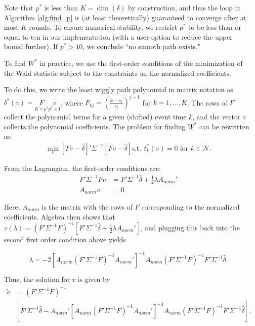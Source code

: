 \documentclass[12pt]{article}
\begin{document}
Note that $p^*$ is less than $K=\dim(\delta)$ by construction, and thus the loop in Algorithm \ref{alg:find_p} is (at least theoretically) guaranteed to converge after at most $K$ rounds.
To ensure numerical stability, we restrict $p^*$ to be less than or equal to ten in our implementation (with a user option to reduce the upper bound further).
If $p^{*}>10$, we conclude ``no smooth path exists."

To find $W^*$ in practice, we use the first-order conditions of the minimization of the Wald statistic subject to the constraints on the normalized coefficients.

To do this, we write the least wiggly path polynomial in matrix notation as $\delta^*(v) = \underset{K\times p^*}{F} \underset{p^* \times 1}{v} $, where $F_{kj} = \left(\frac{k-s_1}{s_2}\right)^{j-1}$ for $k=1, \ldots, K$.
The rows of $F$ collect the polynomial terms for a given (shifted) event time $k$, and the vector $v$ collects the polynomial coefficients.
The problem for finding $W^*$ can be rewritten as:
\begin{align}
\min_v \left[Fv-\widehat{\delta}\right]'\Sigma^{-1}\left[Fv-\widehat{\delta}\right] \text{s.t. } \delta_{k}^*(v)=0 \text{ for } k \in \mathcal{N}. \label{eq:optimization_W*}
\end{align}

From the Lagrangian, the first-order conditions are:
\begin{align*}
F'\Sigma^{-1}F v &=  F' \Sigma^{-1} \widehat{\delta} +\frac{1}{2} \lambda A_{norm}'\\
A_{norm} v &= 0
\end{align*}

Here, $A_{norm}$ is the matrix with the rows of $F$ corresponding to the normalized coefficients.
Algebra then shows that $v(\lambda)=(F'\Sigma^{-1}F)^{-1}[F' \Sigma^{-1} \widehat{\delta} + \frac{1}{2} \lambda A_{norm}']$, and plugging this back into the second first order condition above yields

\begin{equation*}
\lambda = -2[A_{norm}(F'\Sigma^{-1}F)^{-1}A_{norm}']^{-1}A_{norm}(F'\Sigma^{-1}F)^{-1} F' \Sigma^{-1} \widehat{\delta}.
\end{equation*}

Thus, the solution for $v$ is given by
\begin{align*}
\tilde v &= (F'\Sigma^{-1}F)^{-1} \\
& \left[ F' \Sigma^{-1} \widehat{\delta} - A_{norm}'[A_{norm}(F'\Sigma^{-1}F)^{-1}A_{norm}']^{-1}
A_{norm} (F'\Sigma^{-1}F)^{-1}F' \Sigma^{-1} \widehat{\delta}\right].
\end{align*}
\end{document}
